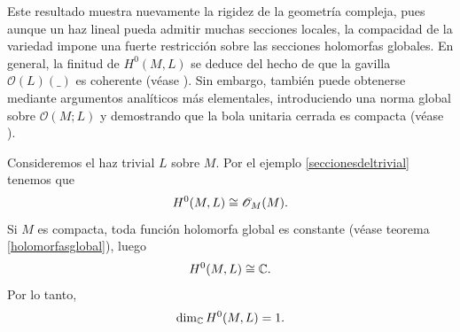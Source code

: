 	Este resultado muestra nuevamente la rigidez de la geometría compleja, pues aunque un haz lineal pueda admitir muchas secciones locales, la compacidad de la variedad impone una fuerte restricción sobre las secciones holomorfas globales. En general, la finitud de $H^0(M,L)$ se deduce del hecho de que la gavilla $\mathcal{O}(L)(\_)$ es coherente (véase \parencite[Chap.~VIII, Sec.~A, Cor.~10]{gunningrossi}). Sin embargo, también puede obtenerse mediante argumentos analíticos más elementales, introduciendo una norma global sobre $\mathcal{O}(M;L)$ y demostrando que la bola unitaria cerrada es compacta (véase \parencite[Chap.~3, Sec.~1, Theo.~3.13]{leecomplex}).
	
	\begin{example}\label{H0deltrivial}
		Consideremos el haz trivial $L$ sobre $M$. Por el ejemplo \ref{seccionesdeltrivial} tenemos que
		\begin{equation*}
			H^0(M,L)\cong \mathscr{O}_M(M).
		\end{equation*} 
		Si $M$ es compacta, toda función holomorfa global es constante (véase teorema \ref{holomorfasglobal}), luego
		\begin{equation*}
			H^0(M,L)\cong\mathbb{C}.
		\end{equation*}
		Por lo tanto,
		\begin{equation*}
			\dim_{\mathbb{C}} H^0(M,L)=1.
		\end{equation*}
	\end{example}
	
